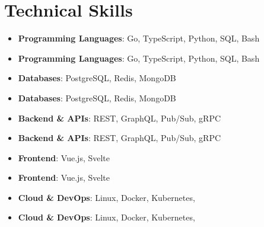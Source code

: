 \documentclass[a4paper,11pt]{article}
\newcommand{\resumeItem}[2][]{%
  \if\relax\detokenize{#1}\relax
    \item \small{#2}%
  \else
    \item[] \small{#2}\vspace{#1}%
  \fi
}
\newcommand{\resumeListStart}[1][0.15in]{\begin{itemize}[leftmargin=#1,label=\textbullet]}
\newcommand{\resumeListEnd}{\end{itemize}\vspace{-7pt}}
\begin{document}
\section{Technical Skills}
\resumeListStart
    \resumeItem[-6pt] {\textbf{Programming Languages}{: Go, 
    TypeScript, Python, SQL, Bash}} \\
    \resumeItem[-6pt] {\textbf{Databases}{: PostgreSQL, 
    Redis, MongoDB}} \\
    \resumeItem[-6pt] {\textbf{Backend \& APIs}{: REST, GraphQL, Pub/Sub, gRPC}} \\
    \resumeItem[-6pt] {\textbf{Frontend}{: Vue.js, Svelte}} \\
    \resumeItem[-6pt] {\textbf{Cloud \& DevOps}{: Linux, Docker, Kubernetes, 
    }}
\resumeListEnd
\end{document}
